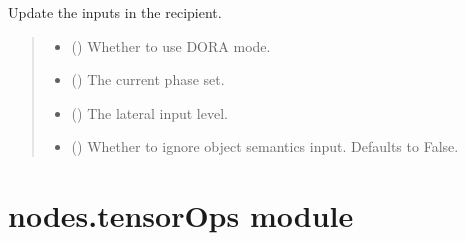 \documentclass[letterpaper,10pt,english]{sphinxmanual}
\begin{document}
\begin{fulllineitems}
\begin{fulllineitems}
\label{\detokenize{nodes:nodes.nodes.Nodes.update_inputs_recpient}}
\pysigstartsignatures
\pysiglinewithargsret
{}
{\sphinxparamcomma {}\sphinxparamcomma {}\sphinxparamcomma {}}
{}
\pysigstopsignatures
\sphinxAtStartPar
Update the inputs in the recipient.
\begin{quote}\begin{description}
\begin{itemize}
\item {} 
\sphinxAtStartPar
{} () \textendash{} Whether to use DORA mode.

\item {} 
\sphinxAtStartPar
{} () \textendash{} The current phase set.

\item {} 
\sphinxAtStartPar
{} () \textendash{} The lateral input level.

\item {} 
\sphinxAtStartPar
{} (\sphinxstyleliteralemphasis{\sphinxupquote{, }}) \textendash{} Whether to ignore object semantics input. Defaults to False.

\end{itemize}

\end{description}\end{quote}

\end{fulllineitems}


\end{fulllineitems}



\section{nodes.tensorOps module}
\label{\detokenize{nodes:module-nodes.tensorOps}}\label{\detokenize{nodes:nodes-tensorops-module}}
\end{document}
